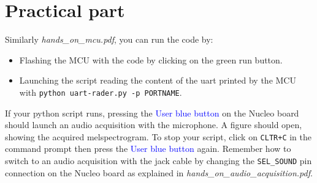 \section{Practical part}
%
Similarly \emph{hands\_on\_mcu.pdf}, you can run the code by:
\begin{itemize}
	\item Flashing the MCU with the code by clicking on the green run button.
	\item Launching the script reading the content of the uart printed by the MCU with \texttt{python uart-rader.py -p PORTNAME}.
\end{itemize}
If your python script runs, pressing the \textcolor{blue}{User blue button} on the Nucleo board should launch an audio acquisition with the microphone. A figure should open, showing the acquired melspectrogram. To stop your script, click on \texttt{CLTR+C} in the command prompt then press the \textcolor{blue}{User blue button} again.  Remember how to switch to an audio acquisition with the jack cable by changing the \texttt{SEL\_SOUND} pin connection on the Nucleo board as explained in \emph{hands\_on\_audio\_acquisition.pdf}.
%
